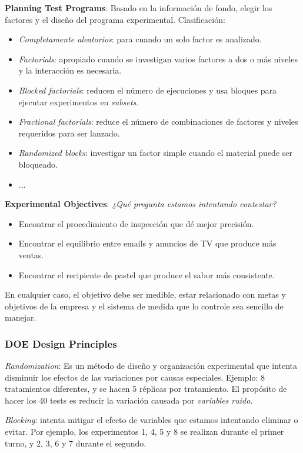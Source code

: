 \documentclass[]{article}
\begin{document}
\textbf{Planning Test Programs}: Basado en la información de fondo, elegir los factores y el diseño del programa experimental. Clasificación:
\begin{itemize}
	\item \textit{Completamente aleatorios}: para cuando un solo factor es analizado.
	\item \textit{Factorials}: apropiado cuando se investigan varios factores a dos o más niveles y la interacción es necesaria.
	\item \textit{Blocked factorials}: reducen el número de ejecuciones y usa bloques para ejecutar experimentos en \textit{subsets}.
	\item \textit{Fractional factorials}: reduce el número de combinaciones de factores y niveles requeridos para ser lanzado.
	\item \textit{Randomized blocks}: investigar un factor simple cuando el material puede ser bloqueado.
	\item ...
\end{itemize}
 
\textbf{Experimental Objectives}: \textit{¿Qué pregunta estamos intentando contestar?} 
\begin{itemize}
	\item Encontrar el procedimiento de inspección que dé mejor precisión.
	\item Encontrar el equilibrio entre emails y anuncios de TV que produce más ventas.
	\item Encontrar el recipiente de pastel que produce el sabor más consistente.
\end{itemize}
En cualquier caso, el objetivo debe ser medible, estar relacionado con metas y objetivos de la empresa y el sistema de medida que lo controle sea sencillo de manejar.

\subsubsection{DOE Design Principles}

\textit{Randomization}: Es un método de diseño y organización experimental que intenta disminuir los efectos de las variaciones por causas especiales. Ejemplo: 8 tratamientos diferentes, y se hacen 5 réplicas por tratamiento. El propósito de hacer los 40 tests es reducir la variación causada por \textit{variables ruido}.

\textit{Blocking}: intenta mitigar el efecto de variables que estamos intentando eliminar o evitar. Por ejemplo, los experimentos 1, 4, 5 y 8 se realizan durante el primer turno, y 2, 3, 6 y 7 durante el segundo.
\end{document}
